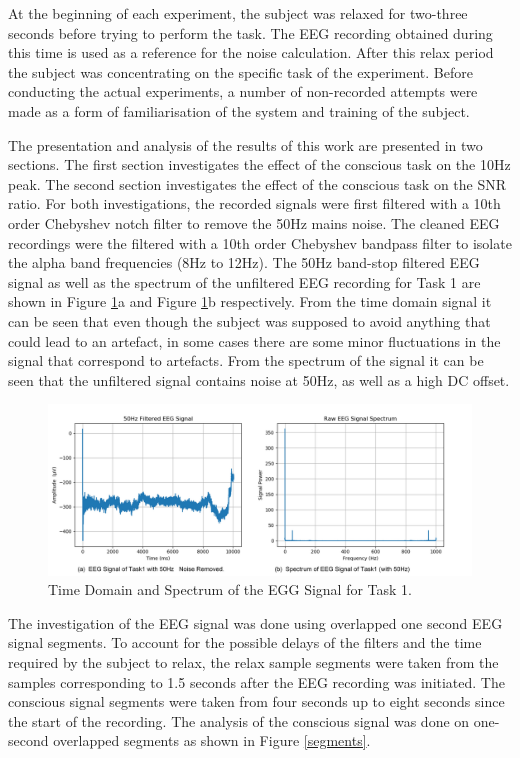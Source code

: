At the beginning of each experiment, the subject was relaxed for two-three seconds before trying to perform the task. The EEG recording obtained during this time is used as a reference for the noise calculation.  After this relax period the subject was concentrating on the specific task of the experiment. Before conducting the actual experiments, a number of non-recorded attempts were made as a form of familiarisation of the system and training of the subject.

The presentation and analysis of the results of this work are presented in two sections.  The first section investigates the effect of the conscious task on the 10Hz peak. The second section investigates the effect of the conscious task on the SNR ratio. For both investigations, the recorded signals were first filtered with a 10th order Chebyshev notch filter to remove the 50Hz mains noise. The cleaned EEG recordings were the filtered with a 10th order Chebyshev bandpass filter to isolate the alpha band frequencies (8Hz to 12Hz). The 50Hz band-stop filtered EEG signal as well as the spectrum of the unfiltered EEG recording for Task 1 are shown in Figure \ref{eegraw}a and Figure \ref{eegraw}b respectively. From the time domain signal it can be seen that even though the subject was supposed to avoid anything that could lead to an artefact, in some cases there are some minor fluctuations in the signal that correspond to artefacts. From the spectrum of the signal it can be seen that the unfiltered signal contains noise at 50Hz, as well as a high DC offset.    

\begin{figure}[hbt!]
	\centering
	\includegraphics[width=\linewidth]{Figures/eeg_raw.jpg} 
	\caption{Time Domain and Spectrum of the EGG Signal for Task 1.} 
	\label{eegraw} 
\end{figure}

 
The investigation of the EEG signal was done using overlapped one second EEG signal segments. To account for the possible delays of the filters and the time required by the subject to relax, the relax sample segments were taken from the samples corresponding to 1.5 seconds after the EEG recording was initiated. The conscious signal segments were taken from four seconds up to eight seconds since the start of the recording. The analysis of the conscious signal was done on one-second overlapped segments as shown in Figure \ref{segments}.


